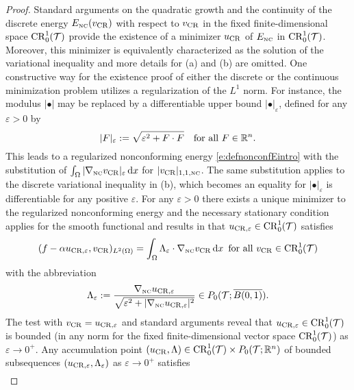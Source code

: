 \begin{proof}
Standard arguments on the quadratic growth and the continuity of the discrete 
energy $E_{\textup{\tiny NC}} (v_{\operatorname{CR}})$ with respect to 
$v_{\operatorname{CR}}$ in the fixed finite-dimensional space  ${\operatorname{CR}}^1_0(\mathcal{T})$ provide the existence 
of a minimizer $u_{\operatorname{CR}}$ of $E_{\textup{\tiny NC}}$ in
${\operatorname{CR}}^1_0(\mathcal{T})$. Moreover, this minimizer is equivalently characterized as the 
solution of the variational inequality
and more details for (a) and (b) are omitted.  One constructive  way for the 
existence proof of either the discrete or the continuous minimization problem 
utilizes a regularization of the $L^1$ norm. 
For instance, the modulus 
 $|\bullet |$ may be replaced by a differentiable upper bound 
$|\bullet|_\varepsilon$, defined for any $\varepsilon>0$ by 
\[
| F |_\varepsilon:=  \sqrt{   \varepsilon^2+ F\cdot F }\quad\text{for all }F\in\mathbb{R}^n.
\]
This leads to a regularized  nonconforming  energy \eqref{e:defnonconfEintro} with the substitution of
$\int_\Omega |\nabla_{\textup{\tiny NC}} v_{\operatorname{CR}} |_\varepsilon\,\mathrm dx$  for   $| v_{\operatorname{CR}} |_{1,1,{\textup{\tiny NC}} }$. The same substitution applies to the
discrete variational inequality in (b),  which becomes an equality 
for $| \bullet |_\varepsilon$ is differentiable for any positive $\varepsilon$. For any $\varepsilon> 0$ there 
exists a unique minimizer to the regularized nonconforming energy and the necessary stationary condition applies for the smooth functional and results in 
that $u_{\operatorname{CR},\varepsilon} \in {\operatorname{CR}}^1_0(\mathcal{T})$  satisfies
\begin{equation*}
(f-\alpha u_{\operatorname{CR},\varepsilon} , v_{\operatorname{CR}})_{L^2(\Omega)} =   \int_\Omega 
\Lambda_\varepsilon \cdot \nabla_{\textup{\tiny NC}} v_{\operatorname{CR}} \,\mathrm dx
\,\text{ for all }v_{\operatorname{CR}}\in {\operatorname{CR}}^1_0(\mathcal{T})
\end{equation*} 
with the abbreviation 
\begin{equation}\label{e:definepvarepsilon}
\Lambda_\varepsilon :=  
\frac{ \nabla_{\textup{\tiny NC}}  u_{\operatorname{CR},\varepsilon}}{ \sqrt{   \varepsilon^2+ |\nabla_{\textup{\tiny NC}}  u_{\operatorname{CR},\varepsilon}|^2 }}\in P_0(\mathcal{T}; \overline{ B(0,1)}).
\end{equation} 
The test with $v_{\operatorname{CR}}=u_{\operatorname{CR},\varepsilon} $ and standard arguments reveal that $u_{\operatorname{CR},\varepsilon} \in {\operatorname{CR}}^1_0(\mathcal{T})$ is bounded 
(in any norm for the fixed finite-dimensional vector space  ${\operatorname{CR}}^1_0(\mathcal{T})$) as $\varepsilon \to 0^+$. 
Any accumulation point $(u_{\operatorname{CR}},\Lambda)\in {\operatorname{CR}}^1_0(\mathcal{T})\times P_0(\mathcal{T};\mathbb{R}^n)$ of bounded subsequences 
$(u_{\operatorname{CR},\varepsilon},\Lambda_\varepsilon)$  as $\varepsilon \to 0^+$ satisfies 
\begin{align}
\label{e:limitidentityforp0}

\end{align}
\end{proof}
